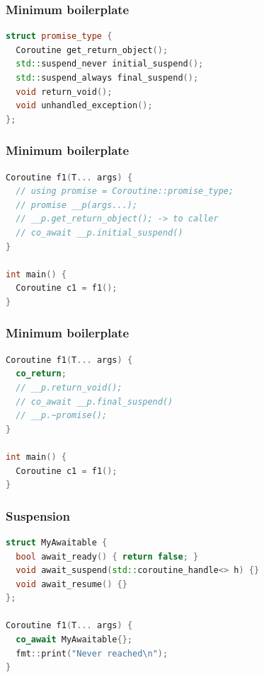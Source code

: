 \documentclass[aspectratio=169]{beamer}
\begin{document}
\begin{frame}[fragile]
  \frametitle{Minimum boilerplate}
  
  \begin{lstlisting}[language={C++}]
struct promise_type {
  Coroutine get_return_object();
  std::suspend_never initial_suspend();
  std::suspend_always final_suspend();
  void return_void();
  void unhandled_exception();
};
  \end{lstlisting}
\end{frame}

\begin{frame}[fragile]
  \frametitle{Minimum boilerplate}
  
  \begin{lstlisting}[language={C++}]
Coroutine f1(T... args) {
  // using promise = Coroutine::promise_type;
  // promise __p(args...);
  // __p.get_return_object(); -> to caller
  // co_await __p.initial_suspend()
}

int main() {
  Coroutine c1 = f1();
}
  \end{lstlisting}
\end{frame}

\begin{frame}[fragile]
  \frametitle{Minimum boilerplate}
  
  \begin{lstlisting}[language={C++}]
Coroutine f1(T... args) {
  co_return;
  // __p.return_void();
  // co_await __p.final_suspend()
  // __p.~promise();
}

int main() {
  Coroutine c1 = f1();
}
  \end{lstlisting}
\end{frame}

\begin{frame}[fragile]
  \frametitle{Suspension}
  
  \begin{lstlisting}[language={C++}]
struct MyAwaitable {
  bool await_ready() { return false; }
  void await_suspend(std::coroutine_handle<> h) {}
  void await_resume() {}
};

Coroutine f1(T... args) {
  co_await MyAwaitable{};
  fmt::print("Never reached\n");
}
  \end{lstlisting}
  
\end{frame}
\end{document}
